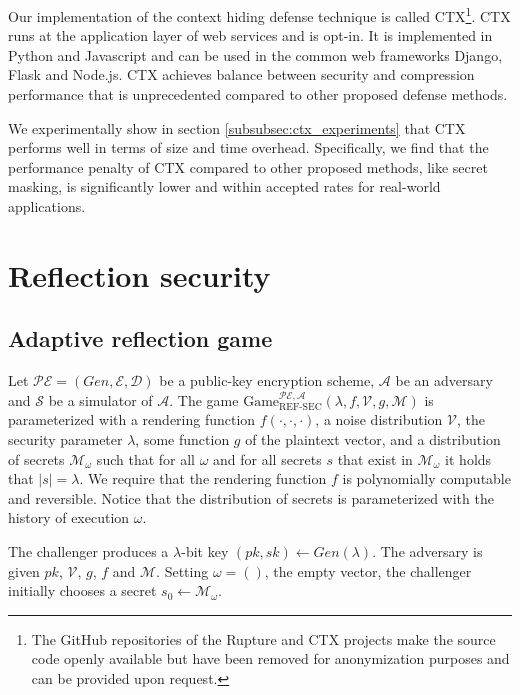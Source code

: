 \documentclass[conference, letterpaper, 10pt]{IEEEtran}
\begin{document}
Our implementation of the context hiding defense technique is called
CTX\footnote[1]{The GitHub repositories of the Rupture and CTX projects make the
source code openly available but have been removed for anonymization purposes
and can be provided upon request.}. CTX runs at the application layer of web
services and is opt-in. It is implemented in Python and Javascript and can be
used in the common web frameworks Django, Flask and Node.js. CTX achieves
balance between security and compression performance that is unprecedented
compared to other proposed defense methods.

We experimentally show in section \ref{subsubsec:ctx_experiments} that CTX
performs well in terms of size and time overhead. Specifically, we find that the
performance penalty of CTX compared to other proposed methods, like secret
masking, is significantly lower and within accepted rates for real-world
applications.

\section{Reflection security}\label{sec:refsec}

\subsection{Adaptive reflection game}\label{subsec:refsecgame}

Let $\mathcal{PE} = (Gen, \mathcal{E}, \mathcal{D})$ be a public-key
encryption scheme, $\mathcal{A}$ be an adversary and $\mathcal{S}$ be a
simulator of $\mathcal{A}$.  The game
$\text{Game}_{\text{REF-SEC}}^{\mathcal{PE},\mathcal{A}}(\lambda,  f,
\mathcal{V}, g, \mathcal{M})$ is parameterized with a rendering function $f(\cdot, \cdot,
\cdot)$, a noise distribution $\mathcal{V}$, the security parameter $\lambda$,
some function $g$ of the plaintext vector, and a distribution of secrets $\mathcal{M}_\omega$
such that for all $\omega$ and for all secrets $s$ that exist in
$\mathcal{M}_\omega$ it holds that $|s| = \lambda$. We
require that the rendering function $f$ is polynomially computable and
reversible. Notice that the distribution of secrets is parameterized with the
history of execution $\omega$.

The challenger produces a $\lambda$-bit key $(pk, sk) \leftarrow
Gen(\lambda)$. The adversary is given $pk$, $\mathcal{V}$, $g$, $f$ and
$\mathcal{M}$.
Setting $\omega = ()$, the empty vector, the challenger initially chooses
a secret $s_0 \leftarrow \mathcal{M}_\omega$.
\end{document}
